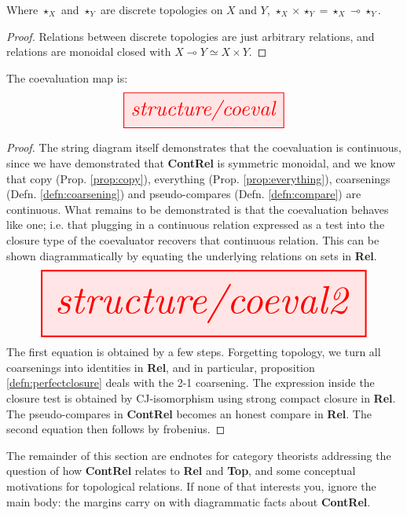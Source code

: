 \begin{proposition}\label{defn:perfectclosure}
Where $\star_X$ and $\star_Y$ are discrete topologies on $X$ and $Y$, $\star_X \times \star_Y = \star_X \multimap \star_Y$.
\begin{proof}
Relations between discrete topologies are just arbitrary relations, and relations are monoidal closed with $X \multimap Y \simeq X \times Y$.
\end{proof}
\end{proposition}

\begin{proposition}\label{prop:coclosure}
The coevaluation map is:
\[\resizebox{0.5\textwidth}{!}{\tikzfig{structure/coeval}}\]
\begin{proof}
The string diagram itself demonstrates that the coevaluation is continuous, since we have demonstrated that \textbf{ContRel} is symmetric monoidal, and we know that copy (Prop. \ref{prop:copy}), everything (Prop. \ref{prop:everything}), coarsenings (Defn. \ref{defn:coarsening}) and pseudo-compares (Defn. \ref{defn:compare}) are continuous. What remains to be demonstrated is that the coevaluation behaves like one; i.e. that plugging in a continuous relation expressed as a test into the closure type of the coevaluator recovers that continuous relation. This can be shown diagrammatically by equating the underlying relations on sets in \textbf{Rel}.
\[\resizebox{\textwidth}{!}{\tikzfig{structure/coeval2}}\]
The first equation is obtained by a few steps. Forgetting topology, we turn all coarsenings into identities in \textbf{Rel}, and in particular, proposition \ref{defn:perfectclosure} deals with the 2-1 coarsening. The expression inside the closure test is obtained by CJ-isomorphism using strong compact closure in \textbf{Rel}. The pseudo-compares in \textbf{ContRel} becomes an honest compare in \textbf{Rel}. The second equation then follows by frobenius.
\end{proof}
\end{proposition}

 The remainder of this section are endnotes for category theorists addressing the question of how \textbf{ContRel} relates to \textbf{Rel} and \textbf{Top}, and some conceptual motivations for topological relations. If none of that interests you, ignore the main body: the margins carry on with diagrammatic facts about \textbf{ContRel}.

\newpage

